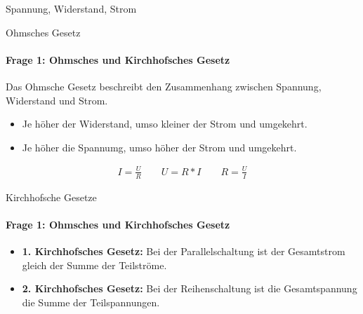 \begin{frame}{Spannung, Widerstand, Strom}
\end{frame}

\begin{frame}{Ohmsches Gesetz}   
    \framesubtitle{Frage 1: Ohmsches und Kirchhofsches Gesetz }
    Das Ohmsche Gesetz beschreibt den Zusammenhang zwischen Spannung, Widerstand und Strom.
    \begin{itemize}
    \item Je höher der Widerstand, umso kleiner der Strom und umgekehrt.
    \item Je höher die Spannumg, umso höher der Strom und umgekehrt.
    \end{itemize}
     
     \begin{align}
      I=\frac{U}{R}  \qquad U = R * I\qquad R = \frac{U}{I}
     \end{align}    

\end{frame}
  
\begin{frame}{Kirchhofsche Gesetze}
    \framesubtitle{Frage 1: Ohmsches und Kirchhofsches Gesetz }
    \begin{itemize}
    \item \textbf{1. Kirchhofsches Gesetz:} Bei der Parallelschaltung ist der Gesamtstrom gleich der Summe der Teilströme.
    
    \item  \textbf{2. Kirchhofsches Gesetz:} Bei der Reihenschaltung ist die Gesamtspannung  die Summe der Teilspannungen.
    

     \end{itemize}
\end{frame}
  

 
 
  
  
